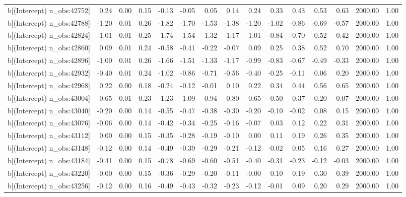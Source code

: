 \begin{table}[ht]
\begin{tabular}{rrrrrrrrrrrrrrr}
  b[(Intercept) n\_obs:42752] & 0.24 & 0.00 & 0.15 & -0.13 & -0.05 & 0.05 & 0.14 & 0.24 & 0.33 & 0.43 & 0.53 & 0.63 & 2000.00 & 1.00 \\ 
  b[(Intercept) n\_obs:42788] & -1.20 & 0.01 & 0.26 & -1.82 & -1.70 & -1.53 & -1.38 & -1.20 & -1.02 & -0.86 & -0.69 & -0.57 & 2000.00 & 1.00 \\ 
  b[(Intercept) n\_obs:42824] & -1.01 & 0.01 & 0.25 & -1.74 & -1.54 & -1.32 & -1.17 & -1.01 & -0.84 & -0.70 & -0.52 & -0.42 & 2000.00 & 1.00 \\ 
  b[(Intercept) n\_obs:42860] & 0.09 & 0.01 & 0.24 & -0.58 & -0.41 & -0.22 & -0.07 & 0.09 & 0.25 & 0.38 & 0.52 & 0.70 & 2000.00 & 1.00 \\ 
  b[(Intercept) n\_obs:42896] & -1.00 & 0.01 & 0.26 & -1.66 & -1.51 & -1.33 & -1.17 & -0.99 & -0.83 & -0.67 & -0.49 & -0.33 & 2000.00 & 1.00 \\ 
  b[(Intercept) n\_obs:42932] & -0.40 & 0.01 & 0.24 & -1.02 & -0.86 & -0.71 & -0.56 & -0.40 & -0.25 & -0.11 & 0.06 & 0.20 & 2000.00 & 1.00 \\ 
  b[(Intercept) n\_obs:42968] & 0.22 & 0.00 & 0.18 & -0.24 & -0.12 & -0.01 & 0.10 & 0.22 & 0.34 & 0.44 & 0.56 & 0.65 & 2000.00 & 1.00 \\ 
  b[(Intercept) n\_obs:43004] & -0.65 & 0.01 & 0.23 & -1.23 & -1.09 & -0.94 & -0.80 & -0.65 & -0.50 & -0.37 & -0.20 & -0.07 & 2000.00 & 1.00 \\ 
  b[(Intercept) n\_obs:43040] & -0.20 & 0.00 & 0.14 & -0.55 & -0.47 & -0.38 & -0.30 & -0.20 & -0.10 & -0.02 & 0.08 & 0.15 & 2000.00 & 1.00 \\ 
  b[(Intercept) n\_obs:43076] & -0.06 & 0.00 & 0.14 & -0.42 & -0.34 & -0.25 & -0.16 & -0.07 & 0.03 & 0.12 & 0.22 & 0.31 & 2000.00 & 1.00 \\ 
  b[(Intercept) n\_obs:43112] & 0.00 & 0.00 & 0.15 & -0.35 & -0.28 & -0.19 & -0.10 & 0.00 & 0.11 & 0.19 & 0.26 & 0.35 & 2000.00 & 1.00 \\ 
  b[(Intercept) n\_obs:43148] & -0.12 & 0.00 & 0.14 & -0.49 & -0.39 & -0.29 & -0.21 & -0.12 & -0.02 & 0.05 & 0.16 & 0.27 & 2000.00 & 1.00 \\ 
  b[(Intercept) n\_obs:43184] & -0.41 & 0.00 & 0.15 & -0.78 & -0.69 & -0.60 & -0.51 & -0.40 & -0.31 & -0.23 & -0.12 & -0.03 & 2000.00 & 1.00 \\ 
  b[(Intercept) n\_obs:43220] & -0.00 & 0.00 & 0.15 & -0.36 & -0.29 & -0.20 & -0.11 & -0.00 & 0.10 & 0.19 & 0.30 & 0.39 & 2000.00 & 1.00 \\ 
  b[(Intercept) n\_obs:43256] & -0.12 & 0.00 & 0.16 & -0.49 & -0.43 & -0.32 & -0.23 & -0.12 & -0.01 & 0.09 & 0.20 & 0.29 & 2000.00 & 1.00 \\ 

\end{tabular}
\end{table}
